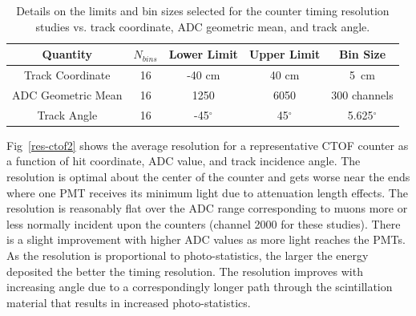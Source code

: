 \documentclass{elsart}
\begin{document}
\begin{table}[htpb]
\begin{center}
\begin{tabular} {|c|c|c|c|c|} \hline
Quantity           & $N_{bins}$ & Lower Limit & Upper Limit & Bin Size \\ \hline
Track Coordinate   & 16 & -40 cm      & 40 cm      & 5~cm \\ \hline
ADC Geometric Mean & 16 & 1250        & 6050       & 300 channels \\ \hline
Track Angle        & 16 & -45$^\circ$ & 45$^\circ$ & 5.625$^\circ$ \\ \hline
\end{tabular}
\end{center}
\caption{Details on the limits and bin sizes selected for the counter timing resolution studies vs.
track coordinate, ADC geometric mean, and track angle.}
\label{res-studies}
\end{table}

Fig~\ref{res-ctof2} shows the average resolution for a representative CTOF counter as a function
of hit coordinate, ADC value, and track incidence angle. The resolution is optimal about the center of
the counter and gets worse near the ends where one PMT receives its minimum light due to attenuation
length effects. The resolution is reasonably flat over the ADC range corresponding to muons more or
less normally incident upon the counters (channel 2000 for these studies). There is a slight improvement
with higher ADC values as more light reaches the PMTs. As the resolution is proportional to photo-statistics, 
the larger the energy deposited the better the timing resolution. The resolution improves with increasing
angle due to a correspondingly longer path through the scintillation material that results in increased
photo-statistics.
\end{document}
